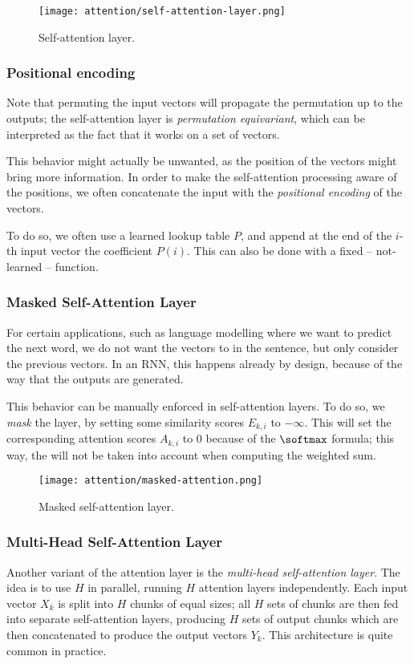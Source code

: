 \begin{figure}[H]
    \centering
    \texttt{[image: attention/self-attention-layer.png]}
    \caption{Self-attention layer.}
\end{figure}

\subsubsection{Positional encoding}
Note that permuting the input vectors will propagate the permutation up to the outputs; the self-attention layer is \emph{permutation equivariant}, which can be interpreted as the fact that it works on a set of vectors. 

This behavior might actually be unwanted, as the position of the vectors might bring more information. In order to make the self-attention processing aware of the positions, we often concatenate the input with the \emph{positional encoding} of the vectors.

To do so, we often use a learned lookup table $P$, and append at the end of the $i$-th input vector the coefficient $P(i)$. This can also be done with a fixed -- not-learned -- function.

\subsubsection{Masked Self-Attention Layer}
For certain applications, such as language modelling where we want to predict the next word, we do not want the vectors to  in the sentence, but only consider the previous vectors. In an RNN, this happens already by design, because of the way that the outputs are generated.

This behavior can be manually enforced in self-attention layers. To do so, we \emph{mask} the layer, by setting some similarity scores $E_{k,i}$ to $-\infty$. This will set the corresponding attention scores $A_{k,i}$ to 0 because of the $\softmax$ formula; this way, the  will not be taken into account when computing the weighted sum.

\begin{figure}[H]
    \centering
    \texttt{[image: attention/masked-attention.png]}
    \caption{Masked self-attention layer.}
\end{figure}

\subsubsection{Multi-Head Self-Attention Layer}
Another variant of the attention layer is the \emph{multi-head self-attention layer}. The idea is to use $H$  in parallel, running $H$ attention layers independently. Each input vector $X_k$ is split into $H$ chunks of equal sizes; all $H$ sets of chunks are then fed into separate self-attention layers, producing $H$ sets of output chunks which are then concatenated to produce the output vectors $Y_k$. This architecture is quite common in practice.

